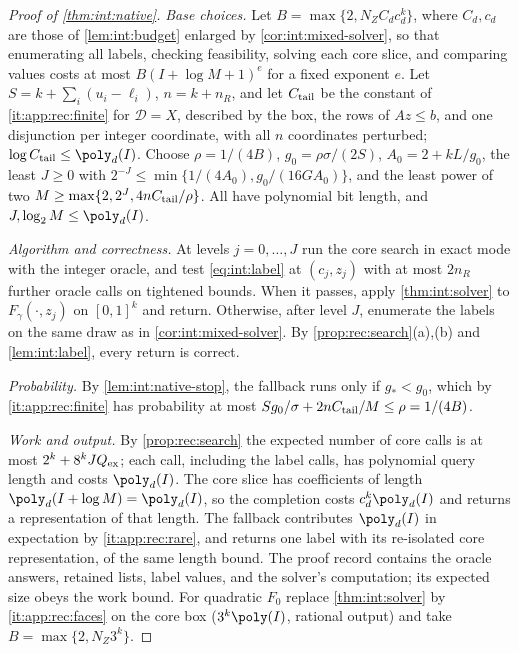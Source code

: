 \begin{proof}[Proof of \cref{thm:int:native}]
\emph{Base choices.} Let $B=\max\{2,N_ZC_dc_d^k\}$, where $C_d,c_d$ are those of
\cref{lem:int:budget} enlarged by \cref{cor:int:mixed-solver}, so that enumerating
all labels, checking feasibility, solving each core slice, and comparing values
costs at most $B(I+\log M+1)^{e}$ for a fixed exponent $e$. Let
$S=k+\sum_i(u_i-\ell_i)$, $n=k+n_R$, and let $C_{\rm tail}$ be the constant of
\ref{it:app:rec:finite} for $\mathcal D=X$, described by the box, the rows of
$Az\le b$, and one disjunction per integer coordinate, with all $n$ coordinates
perturbed; $\log C_{\rm tail}\le\poly_d(I)$. Choose $\rho=1/(4B)$,
$g_0=\rho\sigma/(2S)$, $A_0=2+kL/g_0$, the least $J\ge0$ with
$2^{-J}\le\min\{1/(4A_0),g_0/(16GA_0)\}$, and the least power of two
$M\ge\max\{2,2^J,4nC_{\rm tail}/\rho\}$. All have polynomial bit length, and
$J,\log_2M\le\poly_d(I)$.

\emph{Algorithm and correctness.} At levels $j=0,\ldots,J$ run the core search in
exact mode with the integer oracle, and test \eqref{eq:int:label} at
$(c_j,z_j)$ with at most $2n_R$ further oracle calls on tightened bounds. When it
passes, apply \cref{thm:int:solver} to $F_\gamma(\cdot,z_j)$ on $[0,1]^k$ and
return. Otherwise, after level $J$, enumerate the labels on the same draw as in
\cref{cor:int:mixed-solver}. By \cref{prop:rec:search}(a),(b) and
\cref{lem:int:label}, every return is correct.

\emph{Probability.} By \cref{lem:int:native-stop}, the fallback runs only if
$g_*<g_0$, which by \ref{it:app:rec:finite} has probability at most
$Sg_0/\sigma+2nC_{\rm tail}/M\le\rho=1/(4B)$.

\emph{Work and output.} By \cref{prop:rec:search} the expected number of core
calls is at most $2^k+8^kJQ_{\rm ex}$; each call, including the label calls,
has polynomial query length and costs $\poly_d(I)$. The core slice has
coefficients of length $\poly_d(I+\log M)=\poly_d(I)$, so the completion costs
$c_d^k\poly_d(I)$ and returns a representation of that length. The fallback
contributes $\poly_d(I)$ in expectation by \ref{it:app:rec:rare}, and returns one
label with its re-isolated core representation, of the same length bound. The
proof record contains the oracle answers, retained lists, label values, and the
solver's computation; its expected size obeys the work bound. For quadratic
$F_0$ replace \cref{thm:int:solver} by \ref{it:app:rec:faces} on the core box
($3^k\poly(I)$, rational output) and take $B=\max\{2,N_Z3^k\}$.
\end{proof}


